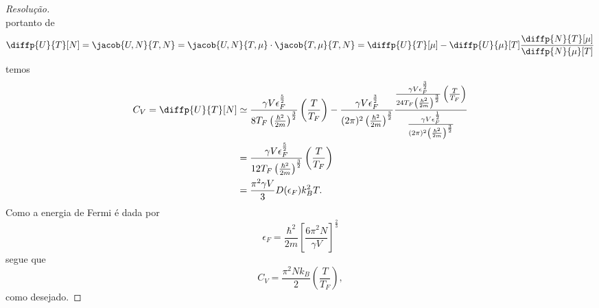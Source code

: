 \begin{proof}[Resolução]
\begin{equation*}
    \end{equation*}
    portanto de
    \begin{equation*}
        \diffp{U}{T}[N] = \jacob{U,N}{T,N} = \jacob{U,N}{T,\mu} \cdot \jacob{T, \mu}{T,N} = \diffp{U}{T}[\mu] - \diffp{U}{\mu}[T]\frac{\diffp{N}{T}[\mu]}{\diffp{N}{\mu}[T]}
    \end{equation*}
    temos
    \begin{align*}
        C_V = \diffp{U}{T}[N]
        &\simeq \frac{\gamma V \epsilon_F^{\frac52}}{8T_F \left(\frac{\hbar^2}{2m}\right)^{\frac32}}\left(\frac{T}{T_F}\right) - \frac{\gamma V \epsilon_F^{\frac32}}{(2\pi)^2\left(\frac{\hbar^2}{2m}\right)^{\frac32}} \frac{\frac{\gamma V \epsilon_F^{\frac{3}{2}}}{24 T_F \left(\frac{\hbar^2}{2m}\right)^{\frac{3}{2}}}\left(\frac{T}{T_F}\right)}{\frac{\gamma V \epsilon_F^{\frac{1}{2}}}{(2\pi)^2 \left(\frac{\hbar^2}{2m}\right)^{\frac{3}{2}}}}\\
        &= \frac{\gamma V\epsilon_F^{\frac52}}{12T_F\left(\frac{\hbar^2}{2m}\right)^{\frac32}}\left(\frac{T}{T_F}\right)\\
        &= \frac{\pi^2 \gamma V}{3} D(\epsilon_F) k_B^2 T.
    \end{align*}
    Como a energia de Fermi é dada por
    \begin{equation*}
        \epsilon_F = \frac{\hbar^2}{2m} \left[\frac{6 \pi^2 N}{\gamma V}\right]^{\frac{2}{3}}
    \end{equation*}
    segue que
    \begin{equation*}
        C_V = \frac{\pi^2 Nk_B}{2}\left(\frac{T}{T_F}\right),
    \end{equation*}
    como desejado.
\end{proof}
